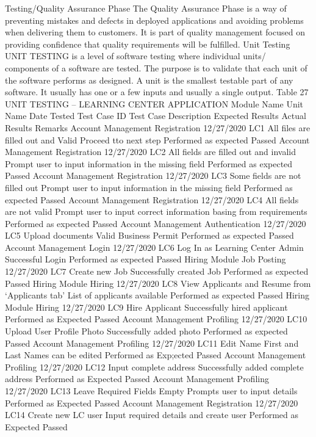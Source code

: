 Testing/Quality Assurance Phase
	The Quality Assurance Phase is a way of preventing mistakes and defects in deployed applications and avoiding problems when delivering them to customers. It is part of quality management focused on providing confidence that quality requirements will be fulfilled. 
Unit Testing
	UNIT TESTING is a level of software testing where individual units/ components of a software are tested. The purpose is to validate that each unit of the software performs as designed. A unit is the smallest testable part of any software. It usually has one or a few inputs and usually a single output.
Table 27
UNIT TESTING – LEARNING CENTER APPLICATION
Module Name	Unit Name	Date Tested	Test Case ID	Test Case Description	Expected Results	Actual Results	Remarks
Account Management	Registration 	12/27/2020	LC1	All files are filled out and Valid	Proceed tto next step	Performed as expected	Passed
Account Management	Registration	12/27/2020	LC2	All fields are filled out and invalid	Prompt user to input information in the missing field	Performed as expected	Passed
Account Management	Registration	12/27/2020	LC3	Some fields are not filled out	Prompt user to input information in the missing field	Performed as expected	Passed
Account Management	Registration	12/27/2020	LC4	All fields are not valid	Prompt user to input correct information basing from requirements	Performed as expected	Passed
Account Management	Authentication	12/27/2020	LC5	Upload documents	Valid Business Permit	Performed as expected	Passed
Account  Management	Login	12/27/2020	LC6	Log In as Learning Center Admin	Successful Login	Performed as expected	Passed
Hiring Module	Job Posting	12/27/2020	LC7	Create new Job	Successfully created Job	Performed as expected	Passed
Hiring Module	Hiring 	12/27/2020	LC8	View Applicants and Resume from ‘Applicants tab’	List of applicants available	Performed as expected	Passed
Hiring Module	Hiring	12/27/2020	LC9 	Hire Applicant	Successfully hired applicant	Performed as Expected	Passed
Account Management	Profiling	12/27/2020	LC10 	Upload User Profile Photo	Successfully added photo	Performed as expected	Passed
Account Management	Profiling	12/27/2020	LC11	Edit Name	First and Last Names can be edited	Performed as Exp;ected	Passed
Account Management 	Profiling	12/27/2020	LC12	Input complete address	Successfully added complete address	Performed as Expected	Passed
Account Management	Profiling	12/27/2020	LC13	Leave Required Fields Empty	Prompts user to input details	Performed as Expected	Passed
Account Management	Registration	12/27/2020	LC14	Create new LC user	Input required details and create user	Performed as Expected	Passed
